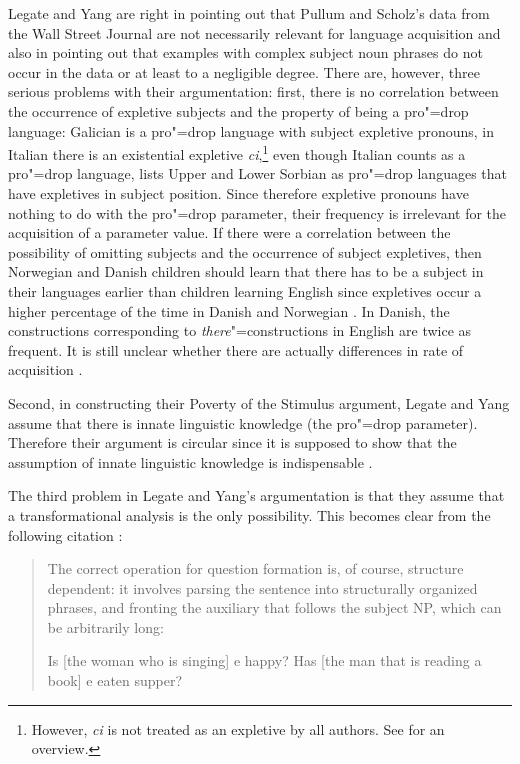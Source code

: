 Legate and Yang are right in pointing out that Pullum and Scholz's data from the Wall Street Journal are not necessarily relevant for language acquisition and also in pointing
out that examples with complex subject noun phrases do not occur in the data or at least to a
negligible degree. There are, however, three serious problems with their argumentation: first, there
is no correlation between the occurrence of expletive subjects and the property of being a pro"=drop
language: Galician \citep[Section~2.5]{RU90a-u} is a pro"=drop language with subject
expletive pronouns, in Italian there is an existential expletive \emph{ci},\footnote{
	However, \emph{ci} is not treated as an expletive by all authors. See  for an overview.
} even though Italian counts as a pro"=drop language, \citet{Franks95a-u} lists Upper and Lower Sorbian as pro"=drop languages
 that have expletives in subject position.
Since therefore expletive pronouns have nothing to do with the pro"=drop parameter, their frequency is irrelevant for the acquisition of a parameter value. If there were a correlation
between the possibility of omitting subjects and the occurrence of subject expletives, then Norwegian and Danish children should learn that there has to be a subject
in their languages earlier than children learning English since expletives occur a higher percentage of the time in Danish and Norwegian \citep[]{SP2002b}.
In Danish, the constructions corresponding to \emph{there}"=constructions in English are twice as frequent. It is still unclear whether there are actually differences in
rate of acquisition \citep[]{Pullum2009a}.

Second, in constructing their Poverty of the Stimulus argument, Legate and Yang assume that there is innate linguistic knowledge (the pro"=drop parameter).
Therefore their argument is circular since it is supposed to show that the assumption of innate linguistic knowledge is indispensable \citep[]{SP2002b}. 

The third problem in Legate and Yang's argumentation is that they assume that a transformational analysis is the only possibility. This becomes clear
from the following citation \citep[]{LY2002a}:
\begin{quote}
The correct operation for question formation is, of course, structure dependent: it involves parsing
the sentence into structurally organized phrases, and fronting the auxiliary that follows the
subject NP, which can be arbitrarily long:
\begin{exe}
\begin{xlist}
\ex Is [the woman who is singing] e happy?
\ex Has [the man that is reading a book] e eaten supper?
\end{xlist}
\end{exe}
\end{quote}

